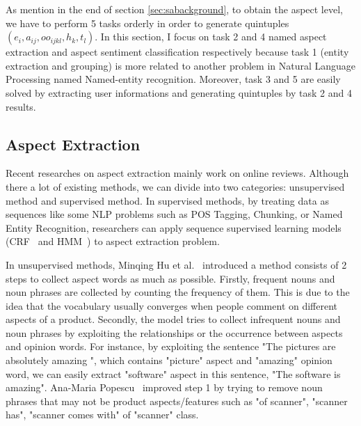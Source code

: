 \documentclass{article}
\begin{document}
As mention in the end of section \ref{sec:sabackground}, to obtain the aspect level, we have to perform 5 tasks orderly in order to generate quintuples $(e_i, a_{ij}, oo_{ijkl}, h_k, t_l)$.
In this section, I focus on task 2 and 4 named aspect extraction and aspect sentiment classification respectively because task 1 (entity extraction and grouping) is more related to another problem in Natural Language Processing named Named-entity recognition.
Moreover, task 3 and 5 are easily solved by extracting user informations and generating quintuples by task 2 and 4 results.

\subsection{Aspect Extraction}
Recent researches on aspect extraction mainly work on online reviews. Although there a lot of existing methods, we can divide into two categories: unsupervised method and supervised method. 
In supervised methods, by treating data as sequences like some NLP problems such as POS Tagging, Chunking, or Named Entity Recognition, researchers can apply sequence supervised learning models (CRF~\cite{Jakob:2010:EOT:1870658.1870759,Lafferty:2001:CRF:645530.655813} and HMM~\cite{Freitag00informationextraction,Jin:2009:NLH:1553374.1553435,Ding:2008:HLA:1341531.1341561}) to aspect extraction problem.

In unsupervised methods, Minqing Hu et al.~\cite{Hu:2004:MSC:1014052.1014073}  introduced a method consists of 2 steps to collect aspect words as much as possible. 
Firstly, frequent nouns and noun phrases are collected by counting the frequency of them.
This is due to the idea that the vocabulary usually converges when people comment on different aspects of a product.
Secondly, the model tries to collect infrequent nouns and noun phrases by exploiting the relationships or the occurrence between aspects and opinion words.
For instance, by exploiting the sentence "The pictures are absolutely amazing	", which contains "picture" aspect and "amazing" opinion word, we can easily extract "software" aspect in this sentence, "The software is amazing".
Ana-Maria Popescu~\cite{Popescu:2005:EPF:1220575.1220618} improved step 1 by trying to remove noun phrases that may not be product aspects/features such as "of scanner", "scanner has", "scanner comes with" of "scanner" class.
\end{document}

